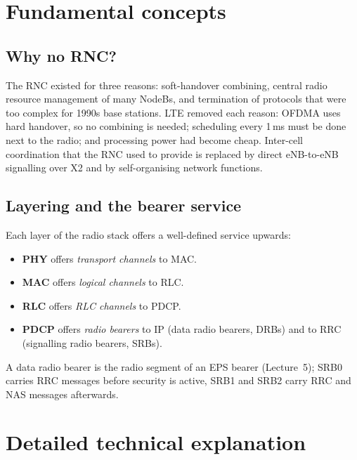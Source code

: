 \documentclass[11pt,a4paper]{article}
\begin{document}
\section{Fundamental concepts}

\subsection{Why no RNC?}
The RNC existed for three reasons: soft-handover combining, central radio resource management
of many NodeBs, and termination of protocols that were too complex for 1990s base stations.
LTE removed each reason: OFDMA uses hard handover, so no combining is needed; scheduling every
1\,ms must be done next to the radio; and processing power had become cheap. Inter-cell
coordination that the RNC used to provide is replaced by direct eNB-to-eNB signalling over X2
and by self-organising network functions.

\subsection{Layering and the bearer service}
Each layer of the radio stack offers a well-defined service upwards:
\begin{itemize}
  \item \textbf{PHY} offers \emph{transport channels} to MAC.
  \item \textbf{MAC} offers \emph{logical channels} to RLC.
  \item \textbf{RLC} offers \emph{RLC channels} to PDCP.
  \item \textbf{PDCP} offers \emph{radio bearers} to IP (data radio bearers, DRBs) and to RRC
        (signalling radio bearers, SRBs).
\end{itemize}
A data radio bearer is the radio segment of an EPS bearer (Lecture~5); SRB0 carries RRC messages
before security is active, SRB1 and SRB2 carry RRC and NAS messages afterwards.

\section{Detailed technical explanation}
\end{document}
